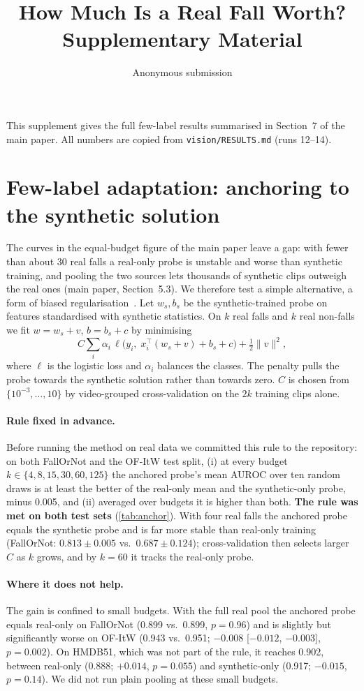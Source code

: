 \documentclass[10pt,twocolumn,letterpaper]{article}
\title{\Large\bf How Much Is a Real Fall Worth? Supplementary Material}
\author{Anonymous submission}
\date{}
\begin{document}
\maketitle
This supplement gives the full few-label results summarised in Section~7 of the main paper. All numbers are copied from \texttt{vision/RESULTS.md} (runs 12--14).

\section{Few-label adaptation: anchoring to the synthetic solution}\label{sec:anchor}
The curves in the equal-budget figure of the main paper leave a gap: with fewer than about 30 real falls a real-only probe is unstable and worse than synthetic training, and pooling the two sources lets thousands of synthetic clips outweigh the real ones (main paper, Section~5.3). We therefore test a simple alternative, a form of biased regularisation~\cite{yang2007asvm,kuzborskij2013,li2018l2sp}. Let $w_s, b_s$ be the synthetic-trained probe on features standardised with synthetic statistics. On $k$ real falls and $k$ real non-falls we fit $w=w_s+v$, $b=b_s+c$ by minimising
\[C\sum_i \alpha_i\,\ell\big(y_i,\;x_i^\top (w_s+v)+b_s+c\big)+\tfrac12\lVert v\rVert^2,\]
where $\ell$ is the logistic loss and $\alpha_i$ balances the classes. The penalty pulls the probe towards the synthetic solution rather than towards zero. $C$ is chosen from $\{10^{-3},\dots,10\}$ by video-grouped cross-validation on the $2k$ training clips alone.

\paragraph{Rule fixed in advance.} Before running the method on real data we committed this rule to the repository: on both FallOrNot and the OF-ItW test split, (i) at every budget $k\in\{4,8,15,30,60,125\}$ the anchored probe's mean AUROC over ten random draws is at least the better of the real-only mean and the synthetic-only probe, minus 0.005, and (ii) averaged over budgets it is higher than both. \textbf{The rule was met on both test sets} (\cref{tab:anchor}). With four real falls the anchored probe equals the synthetic probe and is far more stable than real-only training (FallOrNot: $0.813\pm0.005$ vs.\ $0.687\pm0.124$); cross-validation then selects larger $C$ as $k$ grows, and by $k=60$ it tracks the real-only probe.

\paragraph{Where it does not help.} The gain is confined to small budgets. With the full real pool the anchored probe equals real-only on FallOrNot (0.899 vs.\ 0.899, $p=0.96$) and is slightly but significantly worse on OF-ItW (0.943 vs.\ 0.951; $-0.008$ [$-0.012$, $-0.003$], $p=0.002$). On HMDB51, which was not part of the rule, it reaches 0.902, between real-only (0.888; $+0.014$, $p=0.055$) and synthetic-only (0.917; $-0.015$, $p=0.14$). We did not run plain pooling at these small budgets.
\end{document}
